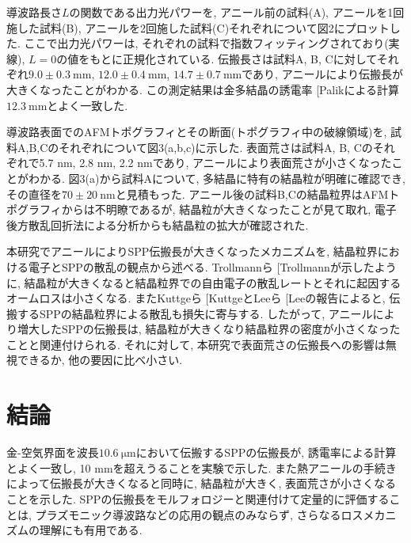 \documentclass[a4,10truept]{jsarticle}
\makeatletter
\DeclareRobustCommand\cite{\unskip
\@ifnextchar[{\@tempswatrue\@citex}{\@tempswafalse\@citex[]}}
\makeatother
\begin{document}
導波路長さ$L$の関数である出力光パワーを, アニール前の試料(A), アニールを1回施した試料(B), アニールを2回施した試料(C)それぞれについて図2にプロットした. ここで出力光パワーは, それぞれの試料で指数フィッティングされており(実線), $L=0$の値をもとに正規化されている. 伝搬長さは試料A, B, Cに対してそれぞれ$9.0\pm0.3\:\mathrm{mm}$, $12.0\pm0.4\:\mathrm{mm}$, $14.7\pm0.7\:\mathrm{mm}$であり, アニールにより伝搬長が大きくなったことがわかる. この測定結果は金多結晶の誘電率\cite{Palik}による計算$12.3\:\mathrm{mm}$とよく一致した. 

導波路表面でのAFMトポグラフィとその断面(トポグラフィ中の破線領域)を, 試料A,B,Cのそれぞれについて図3(a,b,c)に示した. 表面荒さは試料A, B, Cのそれぞれで5.7 nm, 2.8 nm, 2.2 nmであり, アニールにより表面荒さが小さくなったことがわかる. 図3(a)から試料Aについて, 多結晶に特有の結晶粒が明確に確認でき, その直径を$70\pm20\:\mathrm{nm}$と見積もった. アニール後の試料B,Cの結晶粒界はAFMトポグラフィからは不明瞭であるが, 結晶粒が大きくなったことが見て取れ, 電子後方散乱回折法による分析からも結晶粒の拡大が確認された. 

本研究でアニールによりSPP伝搬長が大きくなったメカニズムを, 結晶粒界における電子とSPPの散乱の観点から述べる. Trollmannら\cite{Trollmann}が示したように, 結晶粒が大きくなると結晶粒界での自由電子の散乱レートとそれに起因するオームロスは小さくなる. またKuttgeら\cite{Kuttge}とLeeら\cite{Lee}の報告によると, 伝搬するSPPの結晶粒界による散乱も損失に寄与する. したがって, アニールにより増大したSPPの伝搬長は, 結晶粒が大きくなり結晶粒界の密度が小さくなったことと関連付けられる. それに対して, 本研究で表面荒さの伝搬長への影響は無視できるか, 他の要因に比べ小さい. 

\vspace{-0.2em}
\section{結論}
\vspace{-0.5em}
金-空気界面を波長$10.6\:\mathrm{\mu m}$において伝搬するSPPの伝搬長が, 誘電率による計算とよく一致し, 10 mmを超えうることを実験で示した. また熱アニールの手続きによって伝搬長が大きくなると同時に, 結晶粒が大きく, 表面荒さが小さくなることを示した. SPPの伝搬長をモルフォロジーと関連付けて定量的に評価することは, プラズモニック導波路などの応用の観点のみならず, さらなるロスメカニズムの理解にも有用である. 
\end{document}
